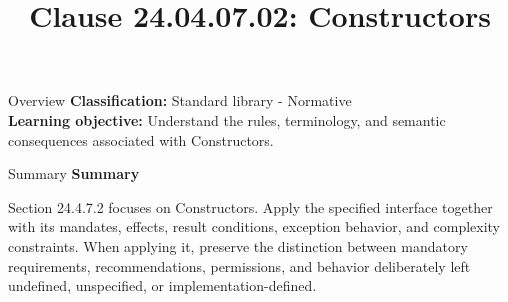 \documentclass[10pt,letterpaper]{article}
\title{Clause 24.04.07.02: Constructors}
\author{}
\date{}
\begin{document}
\maketitle
\begin{CornellOverviewBox}{Overview}
\textbf{Classification:} Standard library - Normative\\[2pt]
\textbf{Learning objective:} Understand the rules, terminology, and semantic consequences associated with Constructors.
\end{CornellOverviewBox}\begin{CornellSummaryBox}{Summary}
{\sffamily\bfseries\color{Accent} Summary}\par\vspace{3pt}Section 24.4.7.2 focuses on Constructors. Apply the specified interface together with its mandates, effects, result conditions, exception behavior, and complexity constraints. When applying it, preserve the distinction between mandatory requirements, recommendations, permissions, and behavior deliberately left undefined, unspecified, or implementation-defined.
\end{CornellSummaryBox}
\end{document}
